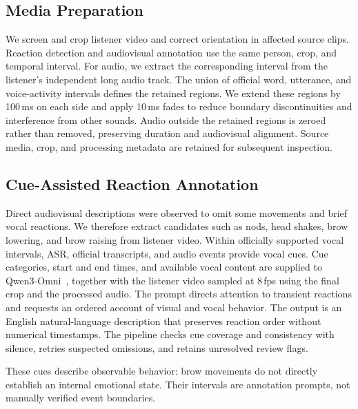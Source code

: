 \subsection{Media Preparation}
We screen and crop listener video and correct orientation in affected source clips. Reaction detection and audiovisual annotation use the same person, crop, and temporal interval. For audio, we extract the corresponding interval from the listener's independent long audio track. The union of official word, utterance, and voice-activity intervals defines the retained regions. We extend these regions by 100\,ms on each side and apply 10\,ms fades to reduce boundary discontinuities and interference from other sounds. Audio outside the retained regions is zeroed rather than removed, preserving duration and audiovisual alignment. Source media, crop, and processing metadata are retained for subsequent inspection.

\subsection{Cue-Assisted Reaction Annotation}
Direct audiovisual descriptions were observed to omit some movements and brief vocal reactions. We therefore extract candidates such as nods, head shakes, brow lowering, and brow raising from listener video. Within officially supported vocal intervals, ASR, official transcripts, and audio events provide vocal cues. Cue categories, start and end times, and available vocal content are supplied to Qwen3-Omni~\cite{qwen3omni}, together with the listener video sampled at 8\,fps using the final crop and the processed audio. The prompt directs attention to transient reactions and requests an ordered account of visual and vocal behavior. The output is an English natural-language description that preserves reaction order without numerical timestamps. The pipeline checks cue coverage and consistency with silence, retries suspected omissions, and retains unresolved review flags.

These cues describe observable behavior: brow movements do not directly establish an internal emotional state. Their intervals are annotation prompts, not manually verified event boundaries.

